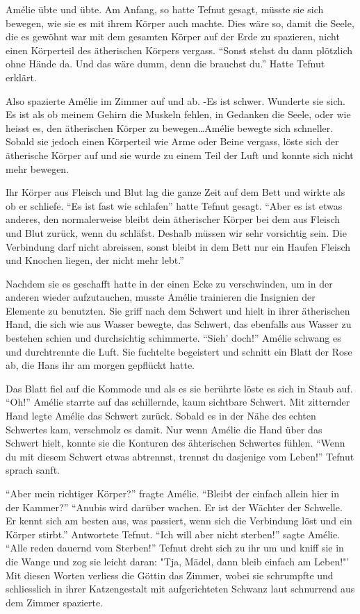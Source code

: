 \documentclass[11pt,titlepage,a5paper]{book}
\begin{document}
Amélie übte und übte. Am Anfang, so hatte Tefnut gesagt, müsste sie sich bewegen, wie sie es mit ihrem Körper auch machte. Dies wäre so, damit die Seele, die es gewöhnt war mit dem gesamten Körper auf der Erde zu spazieren, nicht einen Körperteil des ätherischen Körpers vergass. "`Sonst stehst du dann plötzlich ohne Hände da. Und das wäre dumm, denn die brauchst du."' Hatte Tefnut erklärt.

Also spazierte Amélie im Zimmer auf und ab. -Es ist schwer. Wunderte sie sich. Es ist als ob meinem Gehirn die Muskeln fehlen, in Gedanken die Seele, oder wie heisst es, den ätherischen Körper zu bewegen\dots Amélie bewegte sich schneller. Sobald sie jedoch einen Körperteil wie Arme oder Beine vergass, löste sich der ätherische Körper auf und sie wurde zu einem Teil der Luft und konnte sich nicht mehr bewegen.

Ihr Körper aus Fleisch und Blut lag die ganze Zeit auf dem Bett und wirkte als ob er schliefe. "`Es ist fast wie schlafen"' hatte Tefnut gesagt. "`Aber es ist etwas anderes, den normalerweise bleibt dein ätherischer Körper bei dem aus Fleisch und Blut zurück, wenn du schläfst. Deshalb müssen wir sehr vorsichtig sein. Die Verbindung darf nicht abreissen, sonst bleibt in dem Bett nur ein Haufen Fleisch und Knochen liegen, der nicht mehr lebt."' 

Nachdem sie es geschafft hatte in der einen  Ecke zu verschwinden, um in der anderen wieder aufzutauchen, musste Amélie trainieren die Insignien der Elemente zu benutzten. Sie griff nach dem Schwert und hielt in ihrer ätherischen Hand, die sich wie aus Wasser bewegte, das Schwert, das ebenfalls aus Wasser zu bestehen schien und durchsichtig schimmerte. "`Sieh' doch!"' Amélie schwang es und durchtrennte die Luft. Sie fuchtelte begeistert und schnitt ein Blatt der Rose ab, die Hans ihr am morgen gepflückt hatte.

Das Blatt fiel auf die Kommode und als es sie berührte löste es sich in Staub auf. "`Oh!"' Amélie starrte auf das schillernde, kaum sichtbare Schwert. Mit zitternder Hand legte Amélie das Schwert zurück. Sobald es in der Nähe des echten Schwertes kam, verschmolz es damit. Nur wenn Amélie die Hand über das Schwert hielt, konnte sie die Konturen des ähterischen Schwertes fühlen. "`Wenn du mit diesem Schwert etwas abtrennst, trennst du dasjenige vom Leben!"' Tefnut sprach sanft.

"`Aber mein richtiger Körper?"' fragte Amélie. "`Bleibt der einfach allein hier in der Kammer?"' "`Anubis wird darüber wachen. Er ist der Wächter der Schwelle. Er kennt sich am besten aus, was passiert, wenn sich die Verbindung löst und ein Körper stirbt."' Antwortete Tefnut. "`Ich will aber nicht sterben!"' sagte Amélie. "`Alle reden dauernd vom Sterben!"' Tefnut dreht sich zu ihr um und kniff sie in die Wange und zog sie leicht daran: "Tja, Mädel, dann bleib einfach am Leben!"' Mit diesen Worten verliess die Göttin das Zimmer, wobei sie schrumpfte und schliesslich in ihrer Katzengestalt mit aufgerichteten Schwanz laut schnurrend aus dem Zimmer spazierte.
\end{document}
